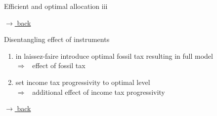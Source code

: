 \documentclass[11pt,aspectratio=169]{beamer}
\newcommand{\ar}{$\Rightarrow$ \ }
\begin{document}
\begin{frame}{Efficient and optimal allocation iii}
\begin{minipage}[]{0.3\textwidth}
	\end{minipage}
	
	\vspace{0mm}
	\hfill
	\hyperlink{effalloback}{\tiny{$\rightarrow$ back}} 
\end{frame}

%
\begin{frame}{{Disentangling effect of instruments}}
	\hypertarget{disen}{}
	\begin{enumerate}
				\item<+-> in laissez-faire introduce optimal fossil tax resulting in full model
		\\ \ar effect of fossil tax
		\vspace{3mm}
		\item<+-> set income tax progressivity to optimal level\\ \ar additional effect of income tax progressivity
	\end{enumerate}

	\vspace{20mm}
\hfill
\hyperlink{effalloback}{\tiny{$\rightarrow$ back}} 
\end{frame}
\end{document}
